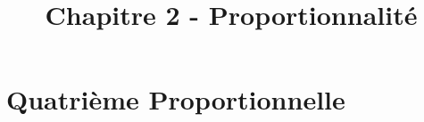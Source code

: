 \documentclass[paper=a4, fontsize=9pt]{scrartcl} %
\title{
  \vspace{-10ex}
  \horrule{0.5pt} %
  \huge Chapitre 2 - Proportionnalité\\
  \horrule{2pt}
}
\author{}
\date{\vspace{-10ex}} %
\begin{document}

\newtheorem{Definition}{Définition}
\newtheorem{Theorem}{Théorème}
\newtheorem{Proposition}{Propriété}

\renewcommand{\labelitemi}{$\bullet$}
\renewcommand{\labelitemii}{$\circ$}

\maketitle %
\setlength{\columnseprule}{1pt}

\section{Quatrième Proportionnelle}
\end{document}
